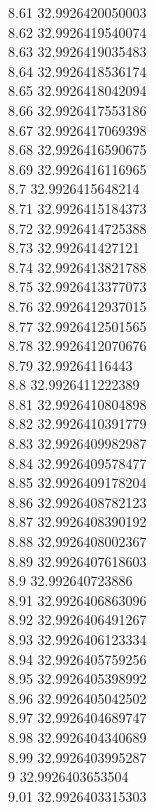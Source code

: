 {8.61	32.9926420050003\\
8.62	32.9926419540074\\
8.63	32.9926419035483\\
8.64	32.9926418536174\\
8.65	32.9926418042094\\
8.66	32.9926417553186\\
8.67	32.9926417069398\\
8.68	32.9926416590675\\
8.69	32.9926416116965\\
8.7	32.9926415648214\\
8.71	32.9926415184373\\
8.72	32.9926414725388\\
8.73	32.992641427121\\
8.74	32.9926413821788\\
8.75	32.9926413377073\\
8.76	32.9926412937015\\
8.77	32.9926412501565\\
8.78	32.9926412070676\\
8.79	32.99264116443\\
8.8	32.9926411222389\\
8.81	32.9926410804898\\
8.82	32.9926410391779\\
8.83	32.9926409982987\\
8.84	32.9926409578477\\
8.85	32.9926409178204\\
8.86	32.9926408782123\\
8.87	32.9926408390192\\
8.88	32.9926408002367\\
8.89	32.9926407618603\\
8.9	32.992640723886\\
8.91	32.9926406863096\\
8.92	32.9926406491267\\
8.93	32.9926406123334\\
8.94	32.9926405759256\\
8.95	32.9926405398992\\
8.96	32.9926405042502\\
8.97	32.9926404689747\\
8.98	32.9926404340689\\
8.99	32.9926403995287\\
9	32.9926403653504\\
9.01	32.9926403315303\\
}
